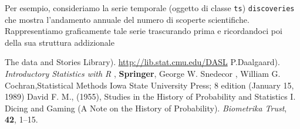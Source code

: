 \documentclass[onecolumn,12pt]{book}
\begin{document}
Per esempio, consideriamo la serie temporale (oggetto di classe \texttt{ts}) \texttt{discoveries} che mostra l'andamento annuale del numero di scoperte scientifiche. Rappresentiamo graficamente tale serie trascurando  prima e ricordandoci poi della sua struttura  addizionale
\printindex
\begin{thebibliography}{}

	{The data and Stories Library). {\url{http://lib.stat.cmu.edu/DASL}} }
	{P.Daalgaard). {\it  Introductory Statistics with R }, {\bf Springer}, }
	{George W. Snedecor , William G. Cochran,Statistical Methods }Iowa State University Press; 8 edition (January 15, 1989)
	{David F. M., (1955), Studies in the History of Probability and Statistics I. Dicing and Gaming (A Note on the History of Probability).} {\it Biometrika Trust}, {\bf 42}, 1--15.
\end{thebibliography}
\printindex
\end{document}
